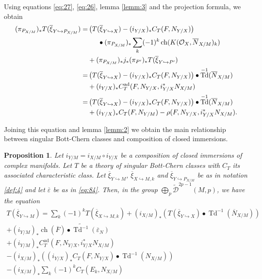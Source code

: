 \documentclass[10pt,twoside]{article}
\numberwithin{equation}{section}
\theoremstyle{plain}
\newtheorem{proposition}[equation]{Proposition}
\theoremstyle{definition}
\DeclareMathOperator{\Td}{Td}
\DeclareMathOperator{\ch}{ch}
\DeclareMathOperator{\ad}{ad}
\begin{document}
Using equations
\eqref{eq:27}, \eqref{eq:26}, lemma \ref{lemm:3} and the projection
formula, we obtain 
\begin{align}
  (\pi _{P_{X/M}})_{\ast} T(\overline \xi_{Y\hookrightarrow P_{X/M}})=&
   \left(T(\overline \xi_{Y\hookrightarrow X})-
    (i_{Y/X})_{\ast}C_{T}(F,N_{Y/X})\right)\notag \\
  &\phantom{AA}\bullet (\pi _{P_{X/M}})_{\ast}
  \sum_{k}(-1)^{k} \ch(K(\mathcal{O}_{X},\overline N_{X/M})_{k})\notag\\
  &+(\pi _{P_{X/M}})_{\ast}j_{\ast}(\pi
  _{P'})_{\ast}T(\overline \xi _{Y\hookrightarrow P'})\notag\\
  =&\left(T(\overline \xi_{Y\hookrightarrow X})-
    (i_{Y/X})_{\ast}C_{T}(F,N_{Y/X})\right)\bullet \Td^{-1}(\overline N_{X/M})\notag\\
  &+(i_{Y/X})_{\ast}C^{\ad}_{T}(F,N_{Y/X},i_{Y/X}^{\ast}N_{X/M})\notag\\
  =&\left(T(\overline \xi_{Y\hookrightarrow X})-
    (i_{Y/X})_{\ast}C_{T}(F,N_{Y/X})\right)\bullet \Td^{-1}(\overline N_{X/M})\notag\\
  &+(i_{Y/X})_{\ast}C_{T}(F,N_{Y/M})-\rho (F,N_{Y/X},i_{Y/X}^{\ast}N_{X/M}).
\label{eq:28}  
\end{align}

Joining this equation and lemma \ref{lemm:2} we obtain the main
relationship between singular Bott-Chern classes and composition of
closed immersions.

\begin{proposition} \label{prop:7}
  Let $i_{Y/M}=i_{X/M}\circ i_{Y/X}$ be a composition of closed
  immersions of complex manifolds. Let $T$ be a theory of singular
  Bott-Chern classes with $C_{T}$ its associated characteristic
  class. Let $\overline \xi_{Y\hookrightarrow M}$, 
  $\overline \xi _{X\hookrightarrow M,k}$ and $\overline
  \xi_{Y\hookrightarrow P_{X/M}}$
  be as in notation \ref{def:4} and let $\overline {\varepsilon }$ be
  as in \eqref{eq:84}.
  Then, in the group $\bigoplus_{p}\widetilde{\mathcal{D}}^{2p-1}(M,p)$,
  we have the equation
  \begin{multline*}
    T(\overline \xi_{Y\hookrightarrow M})=
    \sum_{k}(-1)^{k}T(\overline \xi _{X\hookrightarrow
      M,k})+(i_{X/M})_{\ast}(T(\overline \xi_{Y\hookrightarrow X})\bullet
    \Td^{-1}(\overline N_{X/M}))\\
    +
    (i_{Y/M})_{\ast}\ch(\overline F)\bullet\widetilde
    {\Td^{-1}}(\overline {\varepsilon }_{N})\\
    +(i_{Y/M})_{\ast}C^{\ad}_{T}(F,N_{Y/X},i_{Y/X}^{\ast}N_{X/M})\\
    -(i_{X/M})_{\ast}((i_{Y/X})_{\ast}C_{T}(F,N_{Y/X})\bullet\Td^{-1}(N_{X/M}))\\ 
    -(i_{X/M})_{\ast}\sum_{k}(-1)^{k}
    C_{T}(E_{k},N_{X/M})
  \end{multline*}  
\end{proposition}
\end{document}
